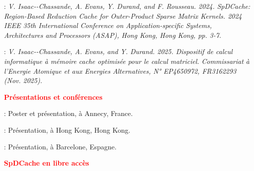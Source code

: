 {\begin{frame}[plain]
{     : {\itshape\color{Blue}\small V. Isaac-{-}Chassande, A. Evans, Y. Durand, and F. Rousseau. 2024. SpDCache: Region-Based Reduction Cache for Outer-Product Sparse Matrix Kernels. 2024 IEEE 35th International Conference on Application-specific Systems, Architectures and Processors (ASAP), Hong Kong, Hong Kong, pp. 3-7.}

    \vspace*{2.5pt}

     : {\itshape\color{Blue}\small V. Isaac-{-}Chassande, A. Evans, and Y. Durand. 2025. Dispositif de calcul informatique à mémoire cache optimisée pour le calcul matriciel. Commissariat à l'Energie Atomique et aux Energies Alternatives, N° EP4650972, FR3162293 (Nov. 2025).}

    }

    \smallskip

    \textbf{\textcolor{Red}{Présentations et conférences}}

     : Poster et présentation, à Annecy, France.
    
     : Présentation, à Hong Kong, Hong Kong.
    
     : Présentation, à Barcelone, Espagne.

    \smallskip

    \textbf{\textcolor{Red}{SpDCache en libre accès}}

    
\end{frame}

}
